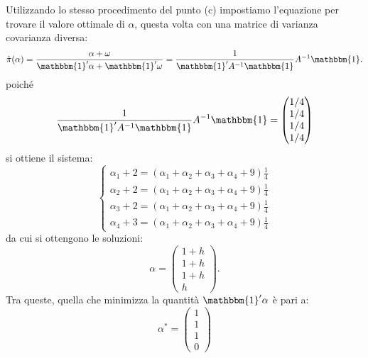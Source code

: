 \begin{alphaparts}
    \questionpart %
    Utilizzando lo stesso procedimento del punto (c) impostiamo l'equazione per trovare il valore ottimale di \(\alpha\), questa volta con una matrice di varianza covarianza diversa:
    \[\hat{\pi}(\alpha) = \frac{\alpha+ \omega}{\mathbbm{1}'\alpha+\mathbbm{1}'\omega} = \frac{1}{\mathbbm{1}'A^{-1}\mathbbm{1}}A^{-1}\mathbbm{1}. \]
    poiché
    \[\frac{1}{\mathbbm{1}'A^{-1}\mathbbm{1}}A^{-1}\mathbbm{1} = \begin{pmatrix}
        1/4 \\ 1/4 \\ 1/4 \\ 1/4
    \end{pmatrix}\]
    si ottiene il sistema:
    \[
        \begin{cases}
            \alpha_1 + 2 = (\alpha_1 + \alpha_2 + \alpha_3 + \alpha_4 + 9) \frac{1}{4} \\
            \alpha_2 + 2 = (\alpha_1 + \alpha_2 + \alpha_3 + \alpha_4 + 9) \frac{1}{4} \\
            \alpha_3 + 2 = (\alpha_1 + \alpha_2 + \alpha_3 + \alpha_4 + 9) \frac{1}{4} \\
            \alpha_4 + 3 = (\alpha_1 + \alpha_2 + \alpha_3 + \alpha_4 + 9) \frac{1}{4}
        \end{cases}\]
        da cui si ottengono le soluzioni:
        \[
            \alpha= \begin{pmatrix}
                1+ h \\ 1+ h \\ 1+ h \\ h
            \end{pmatrix}.\]
        Tra queste, quella che minimizza la quantità \(\mathbbm{1}'\alpha\) è pari a:
        \[\alpha^* = \begin{pmatrix}
            1 \\ 1 \\ 1 \\ 0
        \end{pmatrix}\]


    
\end{alphaparts}
